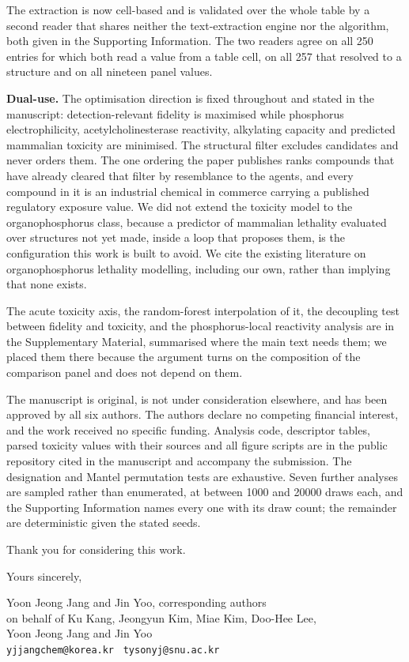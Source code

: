 \documentclass[11pt,a4paper]{article}
\begin{document}
The extraction is now cell-based and is validated over the whole table by a
second reader that shares neither the text-extraction engine nor the algorithm,
both given in the Supporting Information. The two readers agree on all 250
entries for which both read a value from a table cell, on all 257 that resolved
to a structure and on all nineteen panel values.

\textbf{Dual-use.} The optimisation direction is fixed throughout and stated in
the manuscript: detection-relevant fidelity is maximised while phosphorus
electrophilicity, acetylcholinesterase reactivity, alkylating capacity and
predicted mammalian toxicity are minimised. The structural filter excludes
candidates and never orders them. The one ordering the paper publishes ranks
compounds that have already cleared that filter by resemblance to the agents,
and every compound in it is an industrial chemical in commerce carrying a
published regulatory exposure value. We did not extend the toxicity model to the
organophosphorus class, because a predictor of mammalian lethality evaluated over
structures not yet made, inside a loop that proposes them, is the configuration
this work is built to avoid. We cite the existing literature on organophosphorus
lethality modelling, including our own, rather than implying that none exists.

The acute toxicity axis, the random-forest interpolation of it, the decoupling
test between fidelity and toxicity, and the phosphorus-local reactivity analysis
are in the Supplementary Material, summarised where the main text needs them;
we placed them there because the argument turns on the composition of the
comparison panel and does not depend on them.

The manuscript is original, is not under consideration elsewhere, and has been
approved by all six authors. The authors declare no competing financial interest,
and the work received no specific funding. Analysis code, descriptor tables,
parsed toxicity values with their sources and all figure scripts are in the
public repository cited in the manuscript and accompany the submission.
The designation and Mantel permutation tests are exhaustive. Seven further
analyses are sampled rather than enumerated, at between 1000 and 20000 draws
each, and the Supporting Information names every one with its draw count; the
remainder are deterministic given the stated seeds.

Thank you for considering this work.

\vspace{4pt}

\begin{minipage}{\linewidth}
Yours sincerely,

\vspace{5pt}

\noindent Yoon Jeong Jang and Jin Yoo, corresponding authors\\
on behalf of Ku Kang, Jeongyun Kim, Miae Kim, Doo-Hee Lee,\\
Yoon Jeong Jang and Jin Yoo\\
\texttt{yjjangchem@korea.kr} \textperiodcentered\ \texttt{tysonyj@snu.ac.kr}
\end{minipage}
\end{document}
